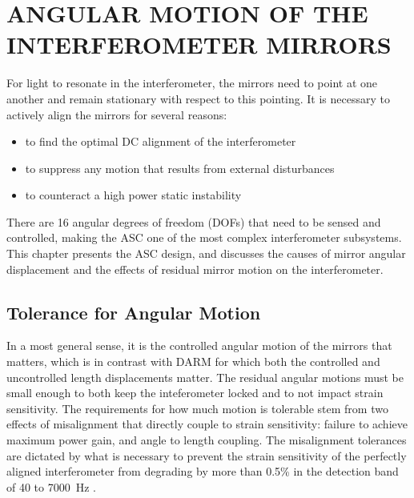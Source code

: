\chapter{ANGULAR MOTION OF THE INTERFEROMETER MIRRORS}

For light to resonate in the interferometer, the mirrors need to point at one another and remain stationary with respect to this pointing. It is necessary to actively align the mirrors for several reasons:
\begin{itemize}
\item to find the optimal DC alignment of the interferometer \vspace{-10 pt}
\item to suppress any motion that results from external disturbances \vspace{-10 pt}
\item to counteract a high power static instability
\end{itemize}
There are 16 angular degrees of freedom (DOFs) that need to be sensed and controlled, making the ASC one of the most complex interferometer subsystems. This chapter presents the ASC design, and discusses the causes of mirror angular displacement and the effects of residual mirror motion on the interferometer.












\section{Tolerance for Angular Motion}
\label{sec:tolerance}
In a most general sense, it is the controlled angular motion of the mirrors that matters, which is in contrast with DARM for which both the controlled and uncontrolled length displacements matter. The residual angular motions must be small enough to both keep the inteferometer locked and to not impact strain sensitivity. The requirements for how much motion is tolerable stem from two effects of misalignment that directly couple to strain sensitivity: failure to achieve maximum power gain, and angle to length coupling. The misalignment tolerances are dictated by what is necessary to prevent the strain sensitivity of the perfectly aligned interferometer from degrading by more than 0.5\% in the detection band of 40 to 7000~Hz \cite{Fritschel1997Alignment}.

